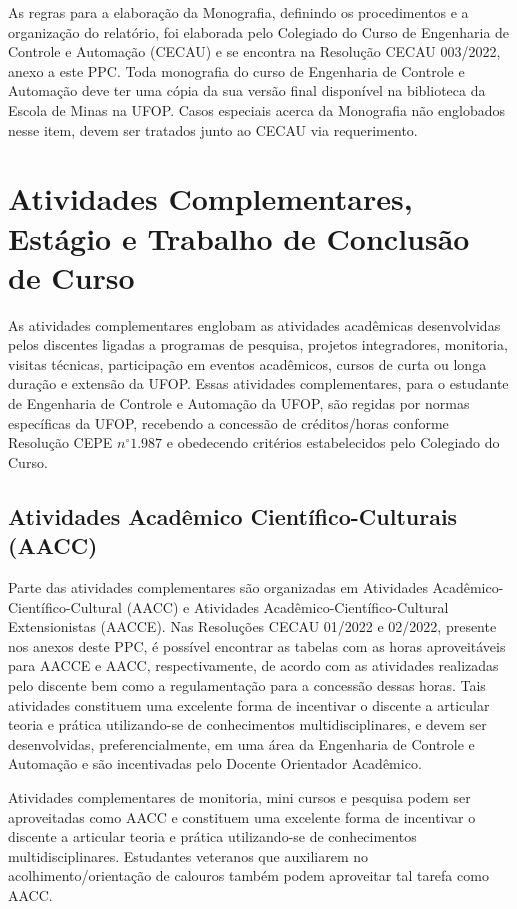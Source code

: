 \documentclass[
	12pt,				%
	openright,			%
	oneside,			%
	a4paper,			%
	english,			%
	brazil				%
	]{abntex2}
\begin{document}
As regras para a elaboração da Monografia, definindo os procedimentos e a organização do relatório, foi elaborada pelo Colegiado do Curso de Engenharia de Controle e Automação (CECAU) e se encontra na Resolução CECAU 003/2022, anexo a este PPC. Toda monografia do curso de Engenharia de Controle e Automação deve ter uma cópia da sua versão final disponível na biblioteca da Escola de Minas na UFOP. Casos especiais acerca da Monografia não englobados nesse item, devem ser tratados junto ao CECAU via requerimento.
%

\section[Atividades Complementares]{Atividades Complementares, Estágio e Trabalho de Conclusão de Curso}

As atividades complementares englobam as atividades acadêmicas desenvolvidas pelos discentes ligadas a programas de pesquisa, projetos integradores, monitoria, visitas técnicas, participação em eventos acadêmicos, cursos de curta ou longa duração e extensão da UFOP. Essas atividades complementares, para o estudante de Engenharia de Controle e Automação da UFOP, são regidas por normas específicas da UFOP, recebendo a concessão de créditos/horas conforme Resolução CEPE $n^{\circ} 1.987$ e obedecendo critérios estabelecidos pelo Colegiado do Curso.

\subsection{Atividades Acadêmico Científico-Culturais (AACC)}
Parte das atividades complementares são organizadas em Atividades Acadêmico-Científico-Cultural (AACC) e Atividades Acadêmico-Científico-Cultural Extensionistas (AACCE). Nas Resoluções CECAU 01/2022 e 02/2022, presente nos anexos deste PPC, é possível encontrar as tabelas com as horas aproveitáveis para AACCE e AACC, respectivamente, de acordo com as atividades realizadas pelo discente bem como a regulamentação para a concessão dessas horas. Tais atividades constituem uma excelente forma de incentivar o discente a articular teoria e prática utilizando-se de conhecimentos multidisciplinares, e devem ser desenvolvidas, preferencialmente, em uma área da Engenharia de Controle e Automação e são incentivadas pelo Docente Orientador Acadêmico.

Atividades complementares de monitoria, mini cursos e pesquisa podem ser aproveitadas como AACC e constituem uma excelente forma de incentivar o discente a articular teoria e prática utilizando-se de conhecimentos multidisciplinares. Estudantes veteranos que auxiliarem no acolhimento/orientação de calouros também podem aproveitar tal tarefa como AACC.
\end{document}
